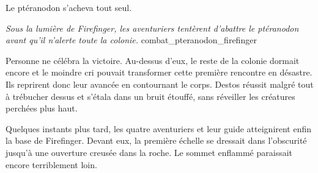 Le ptéranodon s'acheva tout seul.

{\textit{Sous la lumière de Firefinger, les aventuriers tentèrent d'abattre le ptéranodon avant qu'il n'alerte toute la colonie.}}
{combat_pteranodon_firefinger}

Personne ne célébra la victoire. Au-dessus d'eux, le reste de la colonie dormait encore et le moindre cri pouvait transformer cette première rencontre en désastre. Ils reprirent donc leur avancée en contournant le corps. Destos réussit malgré tout à trébucher dessus et s'étala dans un bruit étouffé, sans réveiller les créatures perchées plus haut.

Quelques instants plus tard, les quatre aventuriers et leur guide atteignirent enfin la base de Firefinger. Devant eux, la première échelle se dressait dans l'obscurité jusqu'à une ouverture creusée dans la roche. Le sommet enflammé paraissait encore terriblement loin.

